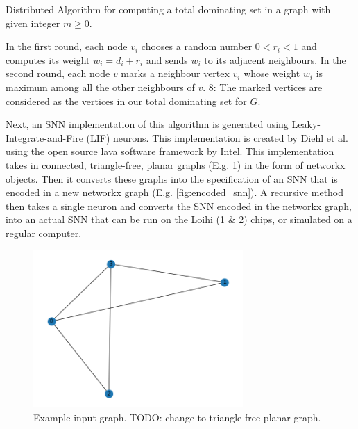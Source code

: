 \begin{algorithm}%
    \caption{Distributed Algorithm for computing a total dominating set in a graph with given integer $m\geq 0$.}\label{alg:alipour}
    In the first round, each node $v_i$ chooses a random number $0<r_i<1$ and computes its weight $w_i=d_i+r_i$ and sends $w_i$ to its
    adjacent neighbours.\;
    In the second round, each node $v$ marks a neighbour vertex $v_i$ whose weight $w_i$ is maximum among all the other neighbours of $v$.\;
    8: The marked vertices are considered as the vertices in our total dominating set for $G$.\;
\end{algorithm}

Next, an SNN implementation of this algorithm is generated using Leaky-Integrate-and-Fire (LIF) neurons. This implementation is created by Diehl et al. \cite{} using the open source lava software framework by Intel. This implementation takes in connected, triangle-free, planar graphs (E.g. \cref{fig:input_graph}) in the form of networkx objects. Then it converts these graphs into the specification of an SNN that is encoded in a new networkx graph (E.g. \cref{fig:encoded_snn}). A recursive method then takes a single neuron and converts the SNN encoded in the networkx graph, into an actual SNN that can be run on the Loihi (1 \& 2) chips, or simulated on a regular computer.
\begin{figure}[H]
    \centering
    \includegraphics[width=8cm]{latex/Images/input_graph.png}
    \caption{Example input graph. TODO: change to triangle free planar graph.%
    }
    \label{fig:input_graph}
\end{figure}

